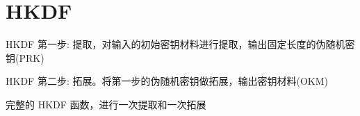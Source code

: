 \section{HKDF}
\label{sec:A}

HKDF 第一步: 提取，对输入的初始密钥材料进行提取，输出固定长度的伪随机密钥(PRK)



HKDF 第二步: 拓展。将第一步的伪随机密钥做拓展，输出密钥材料(OKM)



完整的 HKDF 函数，进行一次提取和一次拓展



\newpage